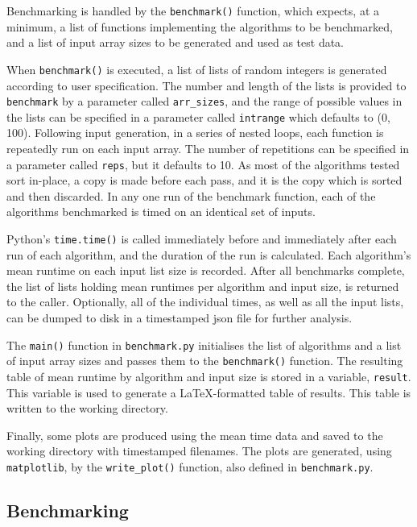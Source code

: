 \documentclass[12pt, a4paper]{article}
\begin{document}
Benchmarking is handled by the \texttt{benchmark()} function, which expects, at a minimum, a list of functions implementing the algorithms to be benchmarked, and a list of input array sizes to be generated and used as test data.

When \texttt{benchmark()} is executed, a list of lists of random integers is generated according to user specification. The number and length of the lists is provided to \texttt{benchmark} by a parameter called \texttt{arr\_sizes}, and the range of possible values in the lists can be specified in a parameter called \texttt{intrange} which defaults to (0, 100). Following input generation, in a series of nested loops, each function is repeatedly run on each input array. The number of repetitions can be specified in a parameter called \texttt{reps}, but it defaults to 10. As most of the algorithms tested sort in-place, a copy is made before each pass, and it is the copy which is sorted and then discarded. In any one run of the benchmark function, each of the algorithms benchmarked is timed on an identical set of inputs.

Python's \texttt{time.time()} is called immediately before and immediately after each run of each algorithm, and the duration of the run is calculated. Each algorithm's mean runtime on each input list size is recorded. After all benchmarks complete, the list of lists holding mean runtimes per algorithm and input size, is returned to the caller. Optionally, all of the individual times, as well as all the input lists, can be dumped to disk in a timestamped json file for further analysis.

The \texttt{main()} function in \texttt{benchmark.py} initialises the list of algorithms and a list of input array sizes and passes them to the \texttt{benchmark()} function. The resulting table of mean runtime by algorithm and input size is stored in a variable, \texttt{result}. This variable is used to generate a LaTeX-formatted table of results. This table is written to the working directory. 

Finally, some plots are produced using the mean time data and saved to the working directory with timestamped filenames. The plots are generated, using \texttt{matplotlib}, by the \texttt{write\_plot()} function, also defined in \texttt{benchmark.py}.

\subsection{Benchmarking}\label{bench}
\end{document}
